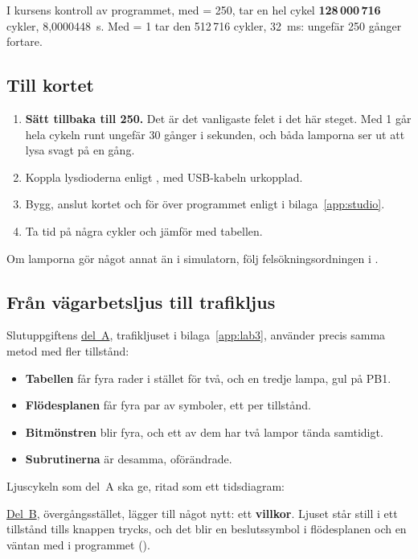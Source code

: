 I kursens kontroll av programmet, med  = 250, tar en hel cykel
\textbf{128\,000\,716} cykler, 8,0000448~s. Med  = 1 tar den 512\,716 cykler,
32~ms: ungefär 250 gånger fortare.

\subsection{Till kortet}
\label{c11:b7}
\begin{enumerate}
  \item \textbf{Sätt tillbaka  till 250.} Det är det vanligaste felet i det här
    steget. Med 1 går hela cykeln runt ungefär 30 gånger i sekunden, och båda lamporna ser ut att
    lysa svagt på en gång.
  \item Koppla lysdioderna enligt , med USB-kabeln urkopplad.
  \item Bygg, anslut kortet och för över programmet enligt  i
    bilaga~\ref{app:studio}.
  \item Ta tid på några cykler och jämför med tabellen.
\end{enumerate}

Om lamporna gör något annat än i simulatorn, följ felsökningsordningen i .

\subsection{Från vägarbetsljus till trafikljus}
\label{c11:b8}
Slutuppgiftens \hyperref[lab3:a]{del~A}, trafikljuset i bilaga~\ref{app:lab3}, använder precis
samma metod med fler tillstånd:
\begin{itemize}
  \item \textbf{Tabellen} får fyra rader i stället för två, och en tredje lampa, gul på PB1.
  \item \textbf{Flödesplanen} får fyra par av symboler, ett per tillstånd.
  \item \textbf{Bitmönstren} blir fyra, och ett av dem har två lampor tända samtidigt.
  \item \textbf{Subrutinerna} är desamma, oförändrade.
\end{itemize}

Ljuscykeln som del~A ska ge, ritad som ett tidsdiagram:


\hyperref[lab3:b]{Del~B}, övergångsstället, lägger till något nytt: ett \textbf{villkor}. Ljuset
står still i ett tillstånd tills knappen trycks, och det blir en beslutssymbol i flödesplanen och
en väntan med  i programmet ().
